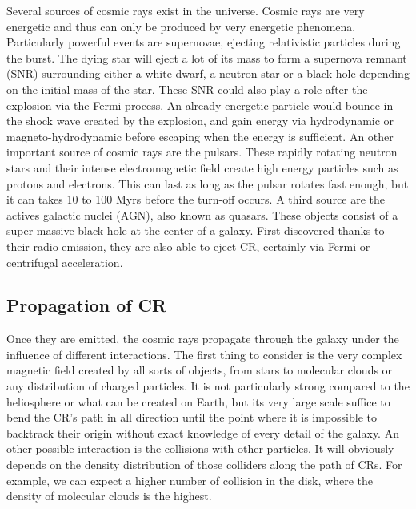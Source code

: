 Several sources of cosmic rays exist in the universe. Cosmic rays are very energetic and thus can only be produced by very energetic phenomena. Particularly powerful events are supernovae, ejecting relativistic particles during the burst. The dying star will eject a lot of its mass to form a supernova remnant (SNR) surrounding either a white dwarf, a neutron star or a black hole depending on the initial mass of the star. These SNR could also play a role after the explosion via the Fermi process. An already energetic particle would bounce in the shock wave created by the explosion, and gain energy via hydrodynamic or magneto-hydrodynamic before escaping when the energy is sufficient.
An other important source of cosmic rays are the pulsars. These rapidly rotating neutron stars and their intense electromagnetic field create high energy particles such as protons and electrons. This can last as long as the pulsar rotates fast enough, but it can takes 10 to 100 Myrs before the turn-off occurs.
A third source are the actives galactic nuclei (AGN), also known as quasars. These objects consist of a super-massive black hole at the center of a galaxy. First discovered thanks to their radio emission, they are also able to eject CR, certainly via Fermi or centrifugal acceleration.


\subsection{Propagation of CR}

Once they are emitted, the cosmic rays propagate through the galaxy under the influence of different interactions.
The first thing to consider is the very complex magnetic field created by all sorts of objects, from stars to molecular clouds or any distribution of charged particles. It is not particularly strong  compared to the heliosphere or what can be created on Earth, but its very large scale suffice to bend the CR's path in all direction until the point where it is impossible to backtrack their origin without exact knowledge of every detail of the galaxy.
An other possible interaction is the collisions with other particles. It will obviously depends on the density distribution of those colliders along the path of CRs. For example, we can expect a higher number of collision in the disk, where the density of molecular clouds is the highest.

